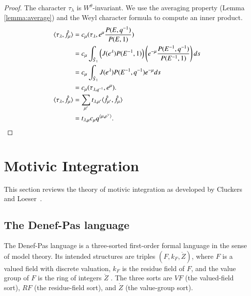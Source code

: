 \begin{proof}
The character $\tau_\lambda$ is $W^\theta$-invariant. 
We use the averaging property (Lemma \ref{lemma:average}) and the Weyl character
formula to compute an inner product.
\begin{align*}
\langle{\tau_\lambda,\hat f_\mu}\rangle
&=c_\mu(\tau_\lambda,e^\mu \frac{P(E,q^{-1})}{P(E,1)})\\
&=c_\mu\int_{\hat S_1} \left(J(e^\lambda) P(E^{-1},1)\right) \left( e^{-\mu}\frac{P(E^{-1},q^{-1})}{P(E^{-1},1)} \right) ds\\
&=
c_\mu\int_{\hat S_1} J(e^\lambda) P(E^{-1},q^{-1}) e^{-\mu} ds\\
&= c_\mu(\tau_{\lambda,q^{-1}},e^\mu).\\
\langle{\tau_\lambda,\hat f_\mu}\rangle
&=\sum_{\mu'} t_{\lambda,\mu'} \langle{\hat f_{\mu'},\hat f_\mu}\rangle \\
&= t_{\lambda,\mu} c_\mu q^{\langle{\mu,\rho^\vee}\rangle}.
\end{align*}
\end{proof}






\section{Motivic Integration}

This section reviews the theory of motivic integration as developed by Cluckers and
Loeser~\cite{cluckers2008constructible}.  

\subsection{The Denef-Pas language}

The Denef-Pas language is a three-sorted first-order formal language in the sense of model theory.  
Its intended structures are triples $(F,k_F,\ring{Z})$, 
where $F$ is a valued field with discrete valuation, 
$k_F$ is the residue field of $F$, 
and the value group of $F$ is the ring of integers $\ring{Z}$ . 
The three sorts are $VF$ (the valued-field sort), $RF$ (the residue-field sort), and $\ring{Z}$ (the value-group sort).

